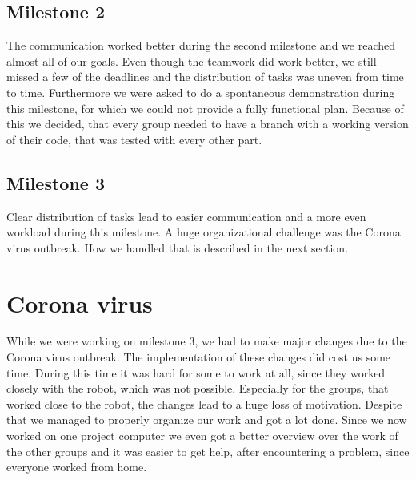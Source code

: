 \documentclass[main.tex]{subfiles}
\begin{document}
		\subsection{Milestone 2}
		The communication worked better during the second milestone and we reached almost all of our goals. Even though the teamwork did work better, we still missed a few of the deadlines and the distribution of tasks was uneven from time to time. Furthermore we were asked to do a spontaneous demonstration during this milestone, for which we could not provide a fully functional plan. Because of this we decided, that every group needed to have a branch with a working version of their code, that was tested with every other part.
		
		\subsection{Milestone 3}
		Clear distribution of tasks lead to easier communication and a more even workload during this milestone.
		A huge organizational challenge was the Corona virus outbreak. How we handled that is described in the next section. 
		
		\section{Corona virus}
	  	While we were working on milestone 3, we had to make major changes due to the Corona virus outbreak. The implementation of these changes did cost us some time. During this time it was hard for some to work at all, since they worked closely with the robot, which was not possible.
	  	Especially for the groups, that worked close to the robot, the changes lead to a huge loss of motivation.
	  	Despite that we managed to properly organize our work and got a lot done.
	  	Since we now worked on one project computer we even got a better overview over the work of the other groups and it was easier to get help, after encountering a problem, since everyone worked from home.

	\endgroup
\end{document}

